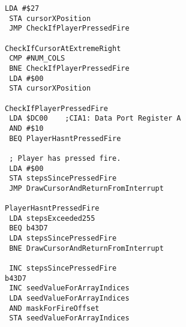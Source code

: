 \begin{minipage}[b]{0.33\linewidth}
\begin{lrbox}{\mybox}
\begin{lstlisting}[basicstyle=\ttfamily\tiny]
 LDA #$27
 STA cursorXPosition
 JMP CheckIfPlayerPressedFire

CheckIfCursorAtExtremeRight   
 CMP #NUM_COLS
 BNE CheckIfPlayerPressedFire
 LDA #$00
 STA cursorXPosition

CheckIfPlayerPressedFire   
 LDA $DC00    ;CIA1: Data Port Register A
 AND #$10
 BEQ PlayerHasntPressedFire

 ; Player has pressed fire.
 LDA #$00
 STA stepsSincePressedFire
 JMP DrawCursorAndReturnFromInterrupt

PlayerHasntPressedFire   
 LDA stepsExceeded255
 BEQ b43D7
 LDA stepsSincePressedFire
 BNE DrawCursorAndReturnFromInterrupt

 INC stepsSincePressedFire
b43D7
 INC seedValueForArrayIndices
 LDA seedValueForArrayIndices
 AND maskForFireOffset
 STA seedValueForArrayIndices

\end{lstlisting}
\end{lrbox}%
\scalebox{0.8}{\usebox{\mybox}}
\end{minipage}
\hspace{-0.1cm}
